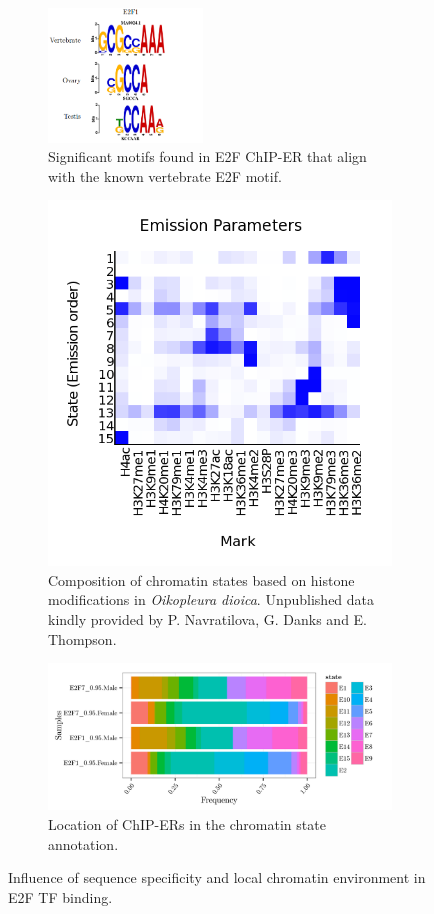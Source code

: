 \documentclass[11pt,twoside,a4paper]{report}
\begin{document}
		\begin{figure}
			\setlength{\belowcaptionskip}{5pt}
			\centering
			\begin{subfigure}[b]{1\textwidth}
				\centering
				\includegraphics[width=0.45\textwidth]{pngs/E2F_motifs.png}
				\caption{Significant motifs found in E2F ChIP-ER that align with the known vertebrate E2F motif.}
			\end{subfigure}
			\begin{subfigure}[b]{1\textwidth}
				\centering
				\includegraphics[width=0.5\linewidth]{pngs/ChromHMM_emissions_15.png}
				\caption{
					Composition of chromatin states based on histone modifications in \textit{Oikopleura dioica}.
					{\footnotesize 	Unpublished data kindly provided by P. Navratilova, G. Danks and E. Thompson.}
				}
			\end{subfigure}
			\begin{subfigure}[b]{1\textwidth}
				\centering
				\includegraphics[width=1\linewidth]{pngs/E2F_chromatinAnnotation.png}
				\caption{Location of ChIP-ERs in the chromatin state annotation.}
			\end{subfigure}
			\caption[Influence of sequence specificity and local chromatin environment in E2F TF binding]
			{Influence of sequence specificity and local chromatin environment in E2F TF binding.}
			\label{fig:E2F_influence}
		\end{figure}
		
\end{document}
